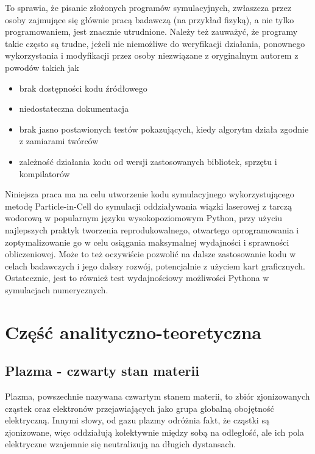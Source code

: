     To sprawia, że pisanie złożonych programów symulacyjnych, zwłaszcza przez osoby
    zajmujące się głównie pracą badawczą (na przykład fizyką), a nie
    tylko programowaniem,
    jest znacznie utrudnione. Należy też zauważyć, że programy takie często są
    trudne, jeżeli nie niemożliwe do weryfikacji działania, ponownego wykorzystania
    i modyfikacji przez osoby niezwiązane z oryginalnym autorem z powodów takich jak
    \begin{itemize}
        \item brak dostępności kodu źródłowego
        \item niedostateczna dokumentacja
        \item brak jasno postawionych testów pokazujących, kiedy algorytm działa zgodnie z zamiarami twórców
        \item zależność działania kodu od wersji zastosowanych bibliotek, sprzętu i kompilatorów
    \end{itemize}

    Niniejsza praca ma na celu utworzenie kodu symulacyjnego wykorzystującego metodę Particle-in-Cell
    do symulacji oddziaływania wiązki laserowej z tarczą wodorową w popularnym języku
    wysokopoziomowym Python, przy użyciu najlepszych praktyk tworzenia reprodukowalnego, otwartego oprogramowania
    i zoptymalizowanie go w celu osiągania maksymalnej wydajności i sprawności obliczeniowej. Może to też oczywiście
    pozwolić na dalsze
    zastosowanie kodu w celach badawczych i jego dalszy rozwój, potencjalnie z użyciem kart graficznych.
    Ostatecznie, jest to również test wydajnościowy możliwości Pythona w symulacjach 
    numerycznych.

\section[Część analityczno-teoretyczna]{Część analityczno-teoretyczna} %

    \subsection{Plazma - czwarty stan materii}

    Plazma, powszechnie nazywana czwartym stanem materii, to zbiór zjonizowanych 
    cząstek oraz elektronów przejawiających jako grupa globalną obojętność elektryczną. Innymi słowy, od gazu plazmy
    odróżnia fakt, że cząstki są zjonizowane, więc oddziałują kolektywnie między sobą na odległość,
    ale ich pola elektryczne wzajemnie się neutralizują na długich dystansach.


